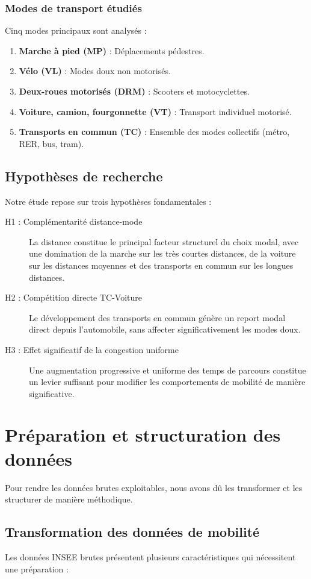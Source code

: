 \documentclass[11pt,a4paper]{article}
\begin{document}
\subsubsection{Modes de transport étudiés}
Cinq modes principaux sont analysés :
\begin{enumerate}[label=\textbf{\arabic*.}]
    \item \textbf{Marche à pied (MP)} : Déplacements pédestres.
    \item \textbf{Vélo (VL)} : Modes doux non motorisés.
    \item \textbf{Deux-roues motorisés (DRM)} : Scooters et motocyclettes.
    \item \textbf{Voiture, camion, fourgonnette (VT)} : Transport individuel motorisé.
    \item \textbf{Transports en commun (TC)} : Ensemble des modes collectifs (métro, RER, bus, tram).
\end{enumerate}
\subsection{Hypothèses de recherche}
Notre étude repose sur trois hypothèses fondamentales :
\begin{description}
    \item[H1 : Complémentarité distance-mode] La distance constitue le principal facteur structurel du choix modal, avec une domination de la marche sur les très courtes distances, de la voiture sur les distances moyennes et des transports en commun sur les longues distances.
    \item[H2 : Compétition directe TC-Voiture] Le développement des transports en commun génère un report modal direct depuis l'automobile, sans affecter significativement les modes doux.
    \item[H3 : Effet significatif de la congestion uniforme] Une augmentation progressive et uniforme des temps de parcours constitue un levier suffisant pour modifier les comportements de mobilité de manière significative.
\end{description}
\section{Préparation et structuration des données}
Pour rendre les données brutes exploitables, nous avons dû les transformer et les structurer de manière méthodique.
\subsection{Transformation des données de mobilité}
Les données INSEE brutes présentent plusieurs caractéristiques qui nécessitent une préparation :
\end{document}
